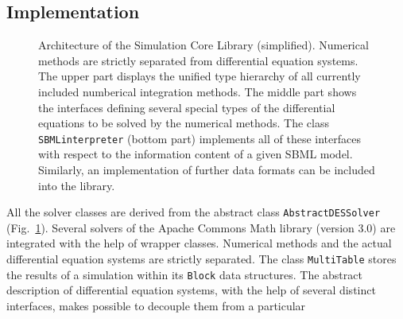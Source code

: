 \documentclass{bioinfo}
\newcommand{\AbstractDESSolver}{\texttt{Abstract\-DES\-Solver}}
\newcommand{\SBMLinterpreter}{\texttt{SBML\-interpreter}}
\newcommand{\MultiTable}{\texttt{Multi\-Table}}
\newcommand{\Block}{\texttt{Block}}
\begin{document}
\begin{methods}
\section{Implementation}
\begin{figure}
\caption[Architecture of the Simulation Core Library]{Architecture of
the Simulation Core Library (simplified). Numerical methods are
strictly separated from differential equation systems. The upper part displays
the unified type hierarchy of all currently included numberical integration
methods. The middle part shows the interfaces defining several
special types of the differential equations to be solved by the numerical
methods.
The class \SBMLinterpreter{} (bottom part) implements all of these interfaces
with respect to the information content of a given SBML model. Similarly, an
implementation of further data formats can be included into the
library.\vspace{-.6cm}}
\label{fig:Architecture}
\end{figure}
All the solver classes are derived from the abstract class \AbstractDESSolver{}
(Fig.~\ref{fig:Architecture}).
Several solvers of the Apache Commons Math library (version 3.0) are integrated
with the help of wrapper classes. Numerical methods and the actual differential
equation systems are strictly separated. The class \MultiTable{} stores the
results of a simulation within its \Block{} data structures. 
%
The abstract description of differential equation systems, with the help of
several distinct interfaces, makes possible to decouple them from a particular

\end{methods}
\end{document}
